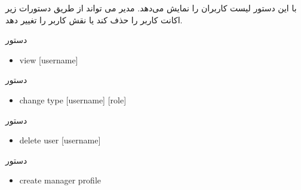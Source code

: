 \documentclass[]{article}
\begin{document}
با این دستور لیست کاربران را نمایش می‌دهد. مدیر می تواند از طریق دستورات زیر اکانت کاربر را حذف کند یا نقش کاربر را تغییر دهد.

\begin{mybox}[colback=brilliantlavender]{دستور}


\begin{latin}

\begin{itemize}[label = {$\Rightarrow$}]

\item
view [username]

\end{itemize}

\end{latin}

\end{mybox}



\begin{mybox}[colback=brilliantlavender]{دستور}


\begin{latin}

\begin{itemize}[label = {$\Rightarrow$}]

\item
change type [username] [role]

\end{itemize}

\end{latin}

\end{mybox}


\begin{mybox}[colback=brilliantlavender]{دستور}


\begin{latin}

\begin{itemize}[label = {$\Rightarrow$}]

\item
delete user [username]

\end{itemize}

\end{latin}

\end{mybox}


\begin{mybox}[colback=brilliantlavender]{دستور}


\begin{latin}

\begin{itemize}[label = {$\Rightarrow$}]

\item
create manager profile

\end{itemize}

\end{latin}

\end{mybox}
\end{document}

